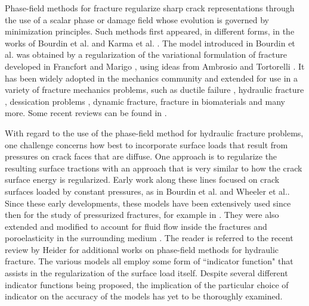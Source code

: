 Phase-field methods for fracture regularize sharp crack representations through the use of a scalar phase or damage field whose evolution is governed by minimization principles.  
Such methods first appeared, in different forms, in the works of Bourdin et al. \cite{bourdin2000numerical} and Karma et al. \cite{karma2001phase}. The model introduced in Bourdin et al. \cite{bourdin2000numerical} was obtained by a regularization of the variational formulation of fracture developed in Francfort and Marigo \cite{francfort1998revisiting}, using ideas from Ambrosio and Tortorelli \cite{ambrosio1990approximation}. It has been widely adopted in the mechanics community and extended for use in a variety of fracture mechanics problems,  such as ductile failure \cite{alessi2014gradient, ambati2015phase, miehe2016phase, borden2016phase, hu2021variationalpaper}, hydraulic fracture \cite{wilson2016phase, chukwudozie2019variational, mikelic2015phase1, santillan2018phase, miehe2016phase}, dessication problems \cite{maurini2013crack, heider2020phase, cajuhi2018phase, hu2020frictionless}, dynamic fracture\cite{bourdin2011time, borden2012phase, hofacker2013phase, schluter2014phase, li2016gradient, kamensky2018hyperbolic, moutsanidis2018hyperbolic}, fracture in biomaterials \cite{wu2020fracture, raina2016phase, nagaraja2021phase, gultekin2016phase, gultekin2018numerical} and many more. Some recent reviews can be found in \cite{ambati2015review, wu2020phase, francfort2021variational}.

With regard to the use of the phase-field method for hydraulic fracture problems, one challenge concerns how best to incorporate surface loads that result from pressures on crack faces that are diffuse. One approach is to regularize the resulting surface tractions with an approach that is very similar to how the crack surface energy is regularized. Early work along these lines focused on crack surfaces loaded by constant pressures, as in Bourdin et al. \cite{bourdin2012variational} and Wheeler et al.\cite{wheeler2014augmented}. Since these early developments, these models have been extensively used since then for the study of pressurized fractures, for example in \cite{tanne2022loss, zulian2021large, yoshioka2019comparative, yoshioka2020crack}. They were also extended and modified to account for fluid flow inside the fractures and poroelasticity in the surrounding medium \cite{miehe2016phase, mikelic2015phase1, chukwudozie2019variational, wilson2016phase, santillan2018phase, heider2017phase, li2022hydro}. The reader is referred to the recent review by  Heider \cite{heider2021review} for additional works on phase-field methods for hydraulic fracture.  The various models all employ some form of ``indicator function" that assists in the regularization of the surface load itself.  Despite several different indicator functions being proposed, the implication of the particular choice of indicator on the accuracy of the models has yet to be thoroughly examined.  
 
